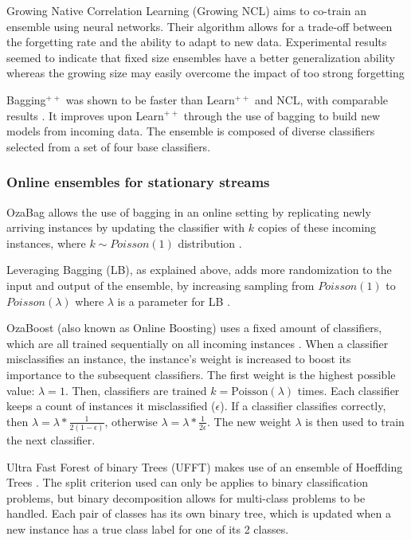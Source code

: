 Growing Native Correlation Learning (Growing NCL) aims to co-train an ensemble using neural networks. Their algorithm allows for a trade-off between the forgetting rate and the ability to adapt to new data. Experimental results seemed to indicate that fixed size ensembles have a better generalization ability whereas the growing size may easily overcome the impact of too strong forgetting \cite{minku2009negative, KRAWCZYK2017132}

Bagging$^{++}$ was shown to be faster than Learn$^{++}$ and NCL, with comparable results \cite{zhao2010incremental, KRAWCZYK2017132}. It improves upon Learn$^{++}$ through the use of bagging to build new models from incoming data. The ensemble is composed of diverse classifiers selected from a set of four base classifiers.

\subsubsection{Online ensembles for stationary streams}
OzaBag allows the use of bagging in an online setting by replicating newly arriving instances by updating the classifier with $k$ copies of these incoming instances, where $k \sim Poisson(1)$ distribution \cite{oza2005online, KRAWCZYK2017132, }.

Leveraging Bagging (LB), as explained above, adds more randomization to the input and output of the ensemble, by increasing sampling from $Poisson(1)$ to $Poisson(\lambda)$ where $\lambda$ is a parameter for LB \cite{bifet2010leveraging, KRAWCZYK2017132}.

OzaBoost (also known as Online Boosting) uses a fixed amount of classifiers, which are all trained sequentially on all incoming instances \cite{oza2005online, KRAWCZYK2017132, }. When a classifier misclassifies an instance, the instance's weight is increased to boost its importance to the subsequent classifiers. The first weight is the highest possible value: $\lambda=1$. Then, classifiers are trained $k=\text{Poisson}(\lambda)$ times. Each classifier keeps a count of instances it misclassified ($\epsilon$). If a classifier classifies correctly, then $\lambda = \lambda * \frac{1}{2(1-\epsilon)}$, otherwise $\lambda = \lambda * \frac{1}{2\epsilon}$. The new weight $\lambda$ is then used to train the next classifier.

Ultra Fast Forest of binary Trees (UFFT) makes use of an ensemble of Hoeffding Trees \cite{gama2005learning, KRAWCZYK2017132, }. The split criterion used can only be applies to binary classification problems, but binary decomposition allows for multi-class problems to be handled. Each pair of classes has its own binary tree, which is updated when a new instance has a true class label for one of its 2 classes.

